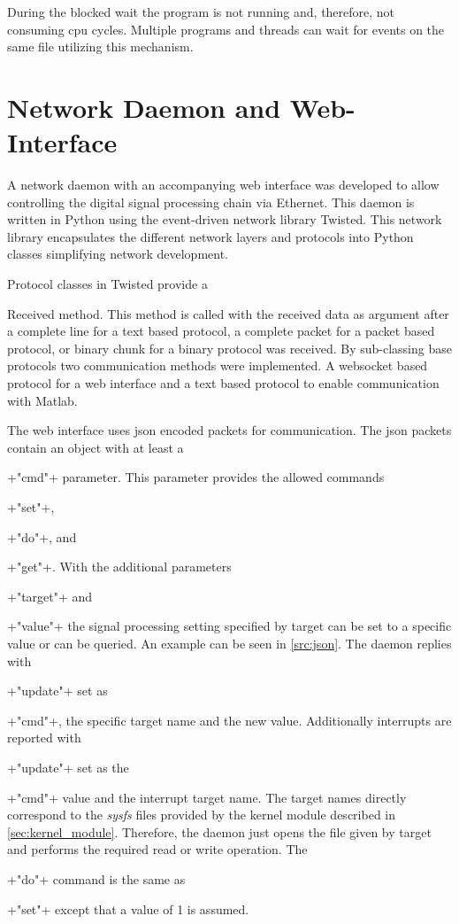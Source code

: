 \documentclass[12pt,a4paper,parskip=full,abstract=true,BCOR=12mm]{scrreprt}
\newcommand*{\SavedLstInline}{}
\DeclareRobustCommand*{\lstinline}{%
  \ifmmode
    \let\SavedBGroup\bgroup
    \def\bgroup{%
      \let\bgroup\SavedBGroup
      \hbox\bgroup
    }%
  \fi
  \SavedLstInline
}
\def\device#1{\mbox{\textit{#1}}}
\begin{document}
During the blocked wait the program is not running and, therefore, not
consuming \gls{cpu} cycles. Multiple programs and threads can wait
for events on the same file utilizing this mechanism.


\section{Network Daemon and Web-Interface}
\label{sec:daemon}
\lstset{language=python}

A network daemon with an accompanying web interface was developed to allow
controlling the digital signal processing chain via Ethernet. This daemon
is written in Python using the event-driven network library Twisted\cite{twisted}.
This network library encapsulates the different network layers and protocols
into Python classes simplifying network development.

Protocol classes in Twisted provide a \lstinline{Received} method. This method
is called with the received data as argument after a complete line for a text based
protocol, a complete packet for a packet based protocol, or binary chunk for a binary
protocol was received. By sub-classing base protocols two communication methods were
implemented. A websocket based protocol for a web interface and a text based protocol
to enable communication with Matlab.

The web interface uses \gls{json} encoded packets for communication. The \gls{json}
packets contain an object with at least a \lstinline+"cmd"+ parameter. This parameter
provides the allowed commands \lstinline+"set"+, \lstinline+"do"+, and \lstinline+"get"+.
With the additional parameters \lstinline+"target"+ and \lstinline+"value"+ the signal
processing setting specified by target can be set to a specific value or can be queried. An example
can be seen in \cref{src:json}. The daemon replies
with \lstinline+"update"+ set as \lstinline+"cmd"+, the specific target name and the
new value. Additionally interrupts are reported with \lstinline+"update"+ set as the
\lstinline+"cmd"+ value and the interrupt target name. The target names directly correspond
to the \device{sysfs} files provided by the kernel module described in
\cref{sec:kernel_module}. Therefore, the daemon just opens the file given by target
and performs the required read or write operation. The \lstinline+"do"+ command is the same
as \lstinline+"set"+ except that a value of 1 is assumed.
\end{document}
